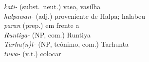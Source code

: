 
\noindent \emph{kati-} (subst.\ neut.) vaso, vasilha\\
\emph{halpawan-} (adj.) proveniente de Halpa; halabeu\\
\emph{paran} (prep.) em frente a\\
\emph{Runtiya-} (NP, com.) Runtiya\\
\emph{Tarhu{(n)}t-} (NP, teônimo, com.) Tarhunta\\
\emph{tuwa-} (v.t.) colocar
